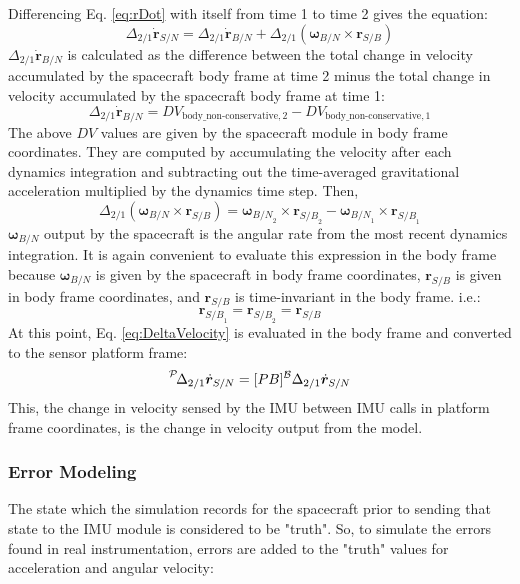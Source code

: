 Differencing Eq. \ref{eq:rDot} with itself from time 1 to time 2 gives the equation:
\begin{equation}
	\Delta_{2/1} 	\dot{\bm{r}}_{S/N} = \Delta_{2/1} \dot{\bm{r}}_{B/N} + \Delta_{2/1} (\bm{\omega}_{B/N} \times \bm{r}_{S/B})
	\label{eq:DeltaVelocity}
\end{equation}
$\Delta_{2/1} \dot{\bm{r}}_{B/N}$ is calculated as the difference between the total change in velocity accumulated by the spacecraft body frame at time 2 minus the total change in velocity accumulated by the spacecraft body frame at time 1:
\begin{equation}
\Delta_{2/1} \dot{\bm{r}}_{B/N} = DV_{\textrm{body\_non-conservative},2} - DV_{\textrm{body\_non-conservative},1}
\end{equation}
The above $DV$ values are given by the spacecraft module in body frame coordinates. They are computed by accumulating the velocity after each dynamics integration and subtracting out the time-averaged gravitational acceleration multiplied by the dynamics time step. Then,
\begin{equation}
	\Delta_{2/1} (\bm{\omega}_{B/N} \times \bm{r}_{S/B}) = \bm{\omega}_{{B/N}_2} \times \bm{r}_{{S/B}_2} - \bm{\omega}_{{B/N}_1} \times \bm{r}_{{S/B}_1}
\end{equation}
$\bm{\omega}_{{B/N}}$ output by the spacecraft is the angular rate from the most recent dynamics integration. It is again convenient to evaluate this expression in the body frame because $\bm{\omega}_{{B/N}}$ is given by the spacecraft in body frame coordinates, $\bm{r}_{S/B}$ is given in body frame coordinates, and $\bm{r}_{S/B}$ is time-invariant in the body frame. i.e.:
\begin{equation}
	\bm{r}_{{S/B}_1} = \bm{r}_{{S/B}_2} = \bm{r}_{S/B}
\end{equation}
 At this point, Eq. \ref{eq:DeltaVelocity} is evaluated in the body frame and converted to the sensor platform frame:
\begin{equation}
\leftexp{P} {\Delta_{2/1}} 	\dot{\bm{r}}_{S/N} = [PB] ^{\mathcal{B}} \Delta_{2/1} 	\dot{\bm{r}}_{S/N}
\end{equation}
This, the change in velocity sensed by the IMU between IMU calls in platform frame coordinates, is the change in velocity output from the model.

\subsubsection{Error Modeling}
The state which the simulation records for the spacecraft prior to sending that state to the IMU module is considered to be "truth". So, to simulate the errors found in real instrumentation, errors are added to the "truth" values for acceleration and angular velocity:

